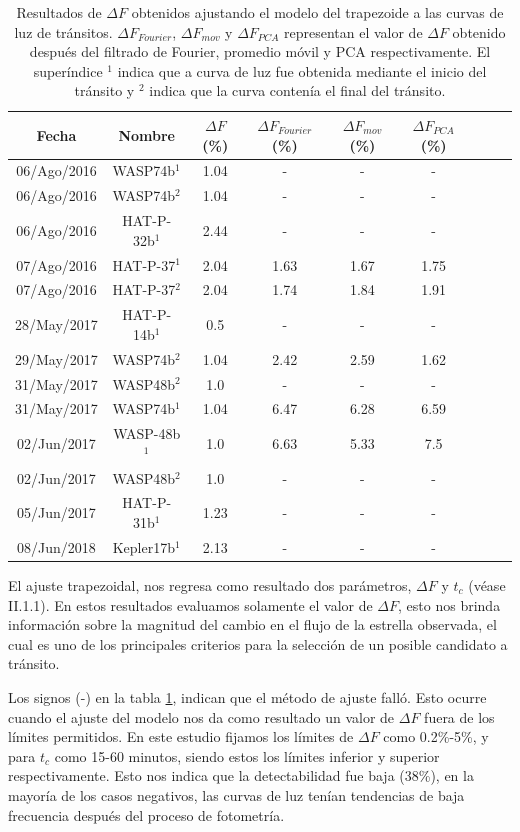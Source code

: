 \begin{table}
	\centering
	\begin{tabular}{ccccccccc}
	\hline 
	Fecha & Nombre & $\Delta F$ (\%) & $\Delta F_{Fourier}$ (\%) &  $\Delta F_{mov}$ (\%) & $\Delta F_{PCA}$ (\%) \\ 
	\hline
	06/Ago/2016 & WASP74b$^{1}$ & 1.04 & - & - & - \\ 
	06/Ago/2016 & WASP74b$^{2}$ & 1.04 & - & - & - \\
	06/Ago/2016 & HAT-P-32b$^{1}$ & 2.44 & - & - & - \\
	07/Ago/2016 & HAT-P-37$^{1}$ & 2.04 & 1.63 & 1.67 & 1.75 \\ 
	07/Ago/2016 & HAT-P-37$^{2}$ & 2.04 & 1.74 & 1.84 & 1.91 \\ 
	28/May/2017 & HAT-P-14b$^{1}$ & 0.5 & - & - & - \\ 
	29/May/2017 & WASP74b$^{2}$ & 1.04 & 2.42 & 2.59 & 1.62 \\ 
	31/May/2017 & WASP48b$^{2}$ & 1.0 & - & - & - \\  
	31/May/2017 & WASP74b$^{1}$ & 1.04 & 6.47 & 6.28 & 6.59 \\
	02/Jun/2017 & WASP-48b$^{1}$ & 1.0 & 6.63 & 5.33 & 7.5 \\
	02/Jun/2017 & WASP48b$^{2}$ & 1.0 & - & - & - \\
	05/Jun/2017 & HAT-P-31b$^{1}$ & 1.23 & - & - & - \\
	08/Jun/2018 & Kepler17b$^{1}$ & 2.13 & - & - & - \\ 
	\hline 
	\end{tabular} 
	\caption{Resultados de $\Delta F$ obtenidos ajustando el modelo del trapezoide a las curvas de luz de tránsitos. $\Delta F_{Fourier}$, $\Delta F_{mov}$ y $\Delta F_{PCA}$ representan el valor de $\Delta F$ obtenido después del filtrado de Fourier, promedio móvil y PCA respectivamente. El superíndice $^{1}$ indica que a curva de luz fue obtenida mediante el inicio del tránsito y $^{2}$ indica que la curva contenía el final del tránsito.}
	\label{tab_resultados_profundidad}
	\end{table}

El ajuste trapezoidal, nos regresa como resultado dos parámetros, $\Delta F$ y $t_{c}$ (véase II.1.1). En estos resultados evaluamos solamente el valor de $\Delta F$, esto nos brinda información sobre la magnitud del cambio en el flujo de la estrella observada, el cual es uno de los principales criterios para la selección de un posible candidato a tránsito. 

Los signos (-) en la tabla \ref{tab_resultados_profundidad}, indican que el método de ajuste falló. Esto ocurre cuando el ajuste del modelo nos da como resultado un valor de $\Delta F$ fuera de los límites permitidos. En este estudio fijamos los límites de $\Delta F$ como 0.2\%-5\%, y para $t_{c}$ como 15-60 minutos, siendo estos los límites inferior y superior respectivamente. Esto nos indica que la detectabilidad fue baja (38\%), en la mayoría de los casos negativos, las curvas de luz tenían tendencias de baja frecuencia después del proceso de fotometría.